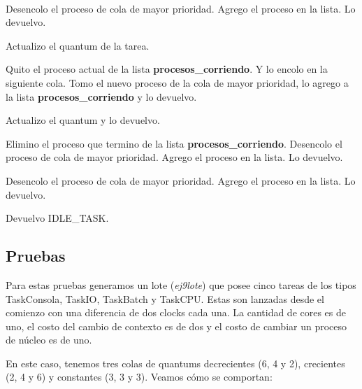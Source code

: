 ~

\begin{algorithmic}

		\State Desencolo el proceso de cola de mayor prioridad.
		\State Agrego el proceso en la lista.
		\State Lo devuelvo.
		
	
		\State Actualizo el quantum de la tarea.

			\State Quito el proceso actual de la lista \textbf{procesos\_corriendo}. Y lo encolo en la siguiente cola.
			\State Tomo el nuevo proceso de la cola de mayor prioridad, lo agrego a la lista \textbf{procesos\_corriendo} y lo devuelvo.

			\State Actualizo el quantum y lo devuelvo.

		\EndIf

		\State Elimino el proceso que termino de la lista \textbf{procesos\_corriendo}.
		\State Desencolo el proceso de cola de mayor prioridad.
		\State Agrego el proceso en la lista.
		\State Lo devuelvo.

		\State Desencolo el proceso de cola de mayor prioridad.
		\State Agrego el proceso en la lista.
		\State Lo devuelvo.
	
	\Else
		\State Devuelvo IDLE\_TASK.

	\EndIf
\EndFunction	
\end{algorithmic}

\subsection{Pruebas}

Para estas pruebas generamos un lote (\textit{ej9lote}) que posee cinco tareas de los tipos TaskConsola, TaskIO, TaskBatch y TaskCPU. Estas son lanzadas desde el comienzo con una diferencia de dos clocks cada una. La cantidad de cores es de uno, el costo del cambio de contexto es de dos y el costo de cambiar un proceso de núcleo es de uno.

En este caso, tenemos tres colas de quantums decrecientes (6, 4 y 2), crecientes (2, 4 y 6) y constantes (3, 3 y 3). Veamos cómo se comportan:


